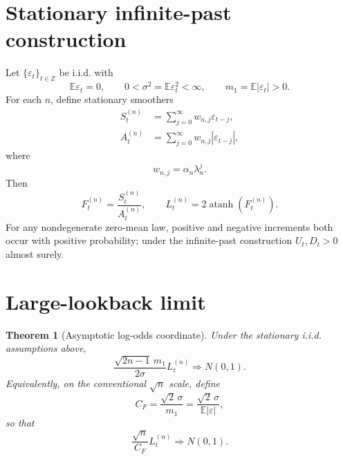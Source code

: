 \documentclass[11pt]{article}
\newtheorem{theorem}{Theorem}
\newcommand{\E}{\mathbb E}
\newcommand{\atanh}{\operatorname{atanh}}
\begin{document}
\section{Stationary infinite-past construction}
Let $\{\varepsilon_t\}_{t\in\mathbb Z}$ be i.i.d. with
\begin{equation}
\E\varepsilon_t=0,\qquad 0<\sigma^2=\E\varepsilon_t^2<\infty,
\qquad m_1=\E|\varepsilon_t|>0.
\end{equation}
For each $n$, define stationary smoothers
\begin{align}
S_t^{(n)}&=\sum_{j=0}^{\infty}w_{n,j}\varepsilon_{t-j},\\
A_t^{(n)}&=\sum_{j=0}^{\infty}w_{n,j}|\varepsilon_{t-j}|,
\end{align}
where
\begin{equation}
w_{n,j}=\alpha_n\lambda_n^j.
\end{equation}
Then
\begin{equation}
F_t^{(n)}=\frac{S_t^{(n)}}{A_t^{(n)}},\qquad
L_t^{(n)}=2\atanh(F_t^{(n)}).
\end{equation}
For any nondegenerate zero-mean law, positive and negative increments both occur with positive probability; under the infinite-past construction $U_t,D_t>0$ almost surely.

\section{Large-lookback limit}
\begin{theorem}[Asymptotic log-odds coordinate]
Under the stationary i.i.d. assumptions above,
\begin{equation}
\boxed{
\frac{\sqrt{2n-1}\,m_1}{2\sigma}L_t^{(n)}
\Rightarrow N(0,1).}
\end{equation}
Equivalently, on the conventional $\sqrt n$ scale, define
\begin{equation}
\boxed{C_F=\frac{\sqrt2\,\sigma}{m_1}=\frac{\sqrt2\,\sigma}{\E|\varepsilon|}},
\end{equation}
so that
\begin{equation}
\frac{\sqrt n}{C_F}L_t^{(n)}\Rightarrow N(0,1).
\end{equation}
\end{theorem}
\end{document}
